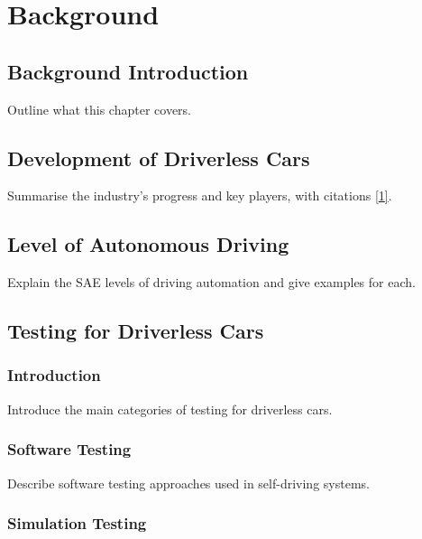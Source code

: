 \documentclass[
  12pt,
  a4paper,
]{report}
\begin{document}
\chapter{Background}\label{background}

\section{Background Introduction}\label{background-introduction}

Outline what this chapter covers.

\section{Development of Driverless
Cars}\label{development-of-driverless-cars}

Summarise the industry's progress and key players, with citations
\hyperref[ref-1]{{[}1{]}}.

\section{Level of Autonomous Driving}\label{level-of-autonomous-driving}

Explain the SAE levels of driving automation and give examples for each.

\section{Testing for Driverless Cars}\label{testing-for-driverless-cars}

\subsection{Introduction}\label{introduction-1}

Introduce the main categories of testing for driverless cars.

\subsection{Software Testing}\label{software-testing}

Describe software testing approaches used in self-driving systems.

\subsection{Simulation Testing}\label{simulation-testing}
\end{document}
